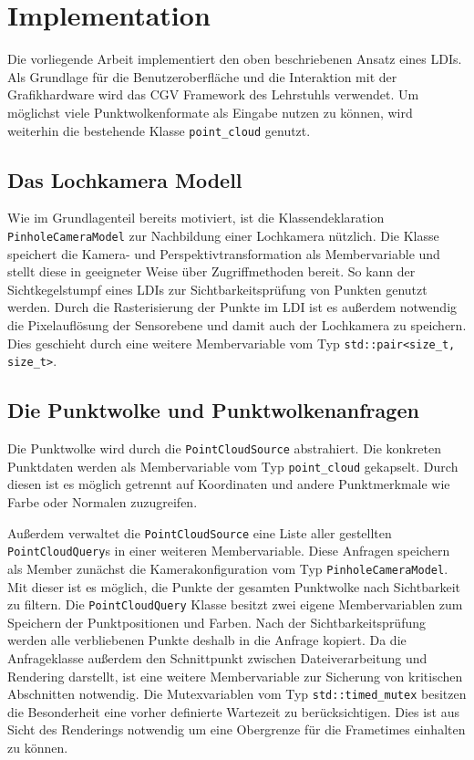 \documentclass[hyperref, beleg, german]{cgvpub}
\begin{document}
\chapter{Implementation}

Die vorliegende Arbeit implementiert den oben beschriebenen Ansatz eines LDIs.
Als Grundlage für die Benutzeroberfläche und die Interaktion mit der
Grafikhardware wird das CGV Framework des Lehrstuhls verwendet. Um möglichst
viele Punktwolkenformate als Eingabe nutzen zu können, wird weiterhin die
bestehende Klasse \texttt{point\_cloud} genutzt.

\section{Das Lochkamera Modell}

Wie im Grundlagenteil bereits motiviert, ist die Klassendeklaration
\texttt{PinholeCameraModel} zur Nachbildung einer Lochkamera nützlich. Die
Klasse speichert die Kamera- und Perspektivtransformation als Membervariable
und stellt diese in geeigneter Weise über Zugriffmethoden bereit. So kann der
Sichtkegelstumpf eines LDIs zur Sichtbarkeitsprüfung von Punkten genutzt
werden. Durch die Rasterisierung der Punkte im LDI ist es außerdem notwendig
die Pixelauflösung der Sensorebene und damit auch der Lochkamera zu speichern.
Dies geschieht durch eine weitere Membervariable vom Typ
\texttt{std::pair<size\_t, size\_t>}.

\section{Die Punktwolke und Punktwolkenanfragen}

Die Punktwolke wird durch die \texttt{PointCloudSource} abstrahiert. Die
konkreten Punktdaten werden als Membervariable vom Typ \texttt{point\_cloud}
gekapselt. Durch diesen ist es möglich getrennt auf Koordinaten und andere
Punktmerkmale wie Farbe oder Normalen zuzugreifen.

Außerdem verwaltet die \texttt{PointCloudSource} eine Liste aller gestellten
\texttt{PointCloudQuery}s in einer weiteren Membervariable. Diese Anfragen
speichern als Member zunächst die Kamerakonfiguration vom Typ
\texttt{PinholeCameraModel}. Mit dieser ist es möglich, die Punkte der gesamten
Punktwolke nach Sichtbarkeit zu filtern. Die \texttt{PointCloudQuery} Klasse
besitzt zwei eigene Membervariablen zum Speichern der Punktpositionen und
Farben. Nach der Sichtbarkeitsprüfung werden alle verbliebenen Punkte deshalb
in die Anfrage kopiert. Da die Anfrageklasse außerdem den Schnittpunkt zwischen
Dateiverarbeitung und Rendering darstellt, ist eine weitere Membervariable zur
Sicherung von kritischen Abschnitten notwendig. Die Mutexvariablen vom Typ
\texttt{std::timed\_mutex} besitzen die Besonderheit eine vorher definierte
Wartezeit zu berücksichtigen. Dies ist aus Sicht des Renderings notwendig um
eine Obergrenze für die Frametimes einhalten zu können.
\end{document}
